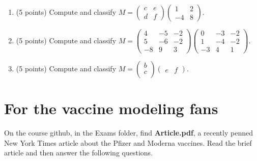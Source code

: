 \documentclass[11pt,onecolumn,superscriptaddress,notitlepage]{article}
\newcommand{\aaa}[0]{5 }
\begin{document}
\begin{enumerate}  
	\item (\aaa points) Compute and classify $M = \begin{pmatrix}
c & e \\
d & f
\end{pmatrix}
\begin{pmatrix}
1 & 2 \\
-4 & 8
\end{pmatrix}$.
\vspace{1.5in}
  
	\item (\aaa points) Compute and classify $M = \begin{pmatrix}
4 & -5 & -2 \\
5 & -6 & -2 \\
-8 & 9 & 3
\end{pmatrix}
\begin{pmatrix}
0 & -3 & -2 \\
1 & -4 & -2 \\
-3 & 4 & 1
\end{pmatrix}$.
\vspace{1.5in}

	\item (\aaa points) Compute and classify $M = \begin{pmatrix}
b \\
c \\
\end{pmatrix}
\begin{pmatrix}
e & f 
\end{pmatrix}$.
\end{enumerate}




\clearpage
\section{For the vaccine modeling fans}

On the course github, in the Exams folder, find {\bf Article.pdf}, a recently penned New York Times article about the Pfizer and Moderna vaccines. Read the brief article and then answer the following questions. 
\end{document}
